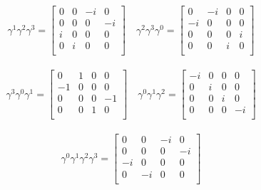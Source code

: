 \begin{align*}
\gamma^1 \gamma^2 \gamma^3 = \begin{bmatrix}
 0  &  0  &  -i  &  0  \\
 0  &  0  &  0  &  -i  \\
 i  &  0  &  0  &  0  \\
 0  &  i  &  0  &  0  \\
\end{bmatrix} \quad
\gamma^2 \gamma^3 \gamma^0 = \begin{bmatrix}
 0  &  -i  &  0  &  0  \\
 -i  &  0  &  0  &  0  \\
 0  &  0  &  0  &  i  \\
 0  &  0  &  i  &  0  \\
\end{bmatrix}
\end{align*}

\begin{align*}
\gamma^3 \gamma^0 \gamma^1 = \begin{bmatrix}
 0  &  1  &  0  &  0  \\
 -1  &  0  &  0  &  0  \\
 0  &  0  &  0  &  -1  \\
 0  &  0  &  1  &  0  \\
\end{bmatrix} \quad
\gamma^0 \gamma^1 \gamma^2 = \begin{bmatrix}
 -i  &  0  &  0  &  0  \\
 0  &  i  &  0  &  0  \\
 0  &  0  &  i  &  0  \\
 0  &  0  &  0  &  -i  \\
\end{bmatrix}
\end{align*}

\begin{align*}
\gamma^0 \gamma^1 \gamma^2 \gamma^3 = \begin{bmatrix}
 0  &  0  &  -i  &  0  \\
 0  &  0  &  0  &  -i  \\
 -i  &  0  &  0  &  0  \\
 0  &  -i  &  0  &  0  \\
\end{bmatrix}
\end{align*}


